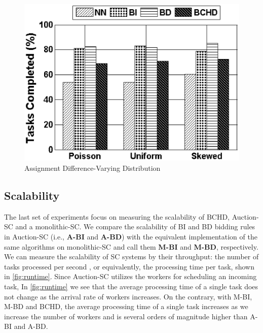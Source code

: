 \begin{figure}[h]
	\centering
	\includegraphics[width=0.75\columnwidth]{figures/dists.eps}
	\vspace{-0.1in}
	\caption{Assignment Difference-Varying Distribution}\label{fig:dists}
\end{figure}

\subsection{Scalability}
\label{subsec:exp_scale}
The last set of experiments focus on measuring the scalability of BCHD, Auction-SC and a monolithic-SC. We compare the scalability of BI and BD bidding rules in Auction-SC (i.e., \textbf{A-BI} and \textbf{A-BD}) with the equivalent implementation of the same algorithms on monolithic-SC and call them \textbf{M-BI} and \textbf{M-BD}, respectively.\\

We can measure the scalability of SC systems by their throughput: the number of tasks processed per second , or equivalently, the processing time per task, shown in \cref{fig:runtime}. Since Auction-SC utilizes the workers for scheduling an incoming task, In \cref{fig:runtime} we see that the average processing time of a single task does not change as the arrival rate of workers increases. On the contrary, with M-BI, M-BD and BCHD, the average processing time of a single task increases as we increase the number of workers and is several orders of magnitude higher than A-BI and A-BD.\\


